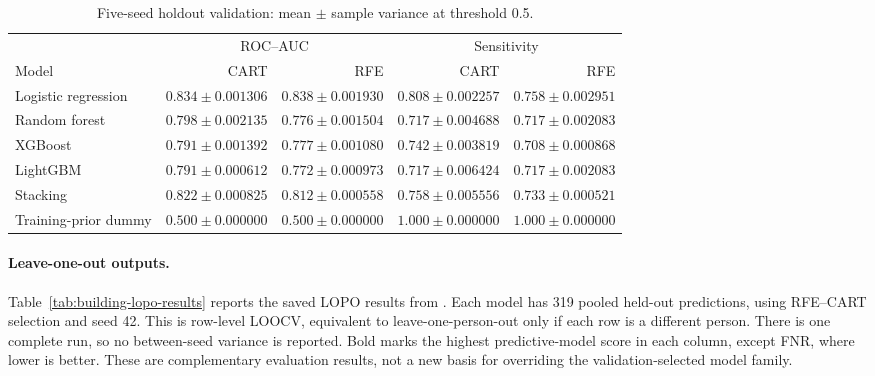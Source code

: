 \begin{table}[H]
\centering
\footnotesize
\setlength{\tabcolsep}{4pt}
\caption{Five-seed holdout validation: mean $\pm$ sample variance at threshold 0.5.}
\label{tab:building-validation-evidence}
\begin{tabular}{@{}lrrrr@{}}
\toprule
& \multicolumn{2}{c}{ROC--AUC} & \multicolumn{2}{c}{Sensitivity} \\
\cmidrule(lr){2-3}\cmidrule(l){4-5}
Model & CART & RFE & CART & RFE \\
\midrule
Logistic regression & $\mathbf{0.834 \pm 0.001306}$ & $\mathbf{0.838 \pm 0.001930}$ & $\mathbf{0.808 \pm 0.002257}$ & $\mathbf{0.758 \pm 0.002951}$ \\
Random forest       & $0.798 \pm 0.002135$ & $0.776 \pm 0.001504$ & $0.717 \pm 0.004688$ & $0.717 \pm 0.002083$ \\
XGBoost             & $0.791 \pm 0.001392$ & $0.777 \pm 0.001080$ & $0.742 \pm 0.003819$ & $0.708 \pm 0.000868$ \\
LightGBM            & $0.791 \pm 0.000612$ & $0.772 \pm 0.000973$ & $0.717 \pm 0.006424$ & $0.717 \pm 0.002083$ \\
Stacking            & $0.822 \pm 0.000825$ & $0.812 \pm 0.000558$ & $0.758 \pm 0.005556$ & $0.733 \pm 0.000521$ \\
\midrule
Training-prior dummy& $0.500 \pm 0.000000$ & $0.500 \pm 0.000000$ & $1.000 \pm 0.000000$ & $1.000 \pm 0.000000$ \\
\bottomrule
\end{tabular}
\end{table}

\paragraph{Leave-one-out outputs.}
\label{subsec:building-lopo-results}

Table~\ref{tab:building-lopo-results} reports the saved LOPO results from
\protect{}. Each model has 319 pooled held-out
predictions, using RFE--CART selection and seed 42. This is row-level LOOCV,
equivalent to leave-one-person-out only if each row is a different person.
There is one complete run, so no between-seed variance is reported. Bold marks
the highest predictive-model score in each column, except FNR, where lower
is better. These are complementary evaluation results, not a new basis for
overriding the validation-selected model family.


